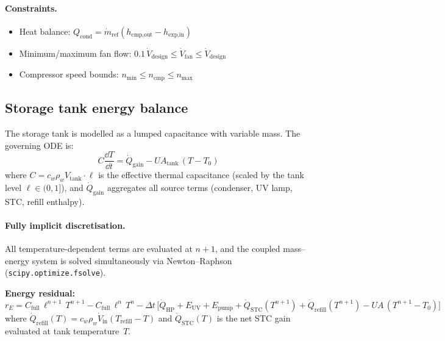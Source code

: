 \paragraph{Constraints.}
\begin{itemize}
  \item Heat balance: $Q_\text{cond} = \dot{m}_\text{ref}(h_\text{cmp,out} - h_\text{exp,in})$
  \item Minimum/maximum fan flow: $0.1\,\dot{V}_\text{design} \le \dot{V}_\text{fan} \le \dot{V}_\text{design}$
  \item Compressor speed bounds: $n_\text{min} \le n_\text{cmp} \le n_\text{max}$
\end{itemize}

\subsection{Storage tank energy balance}
\label{sec:ashpb-tank}

The storage tank is modelled as a lumped capacitance with variable mass.
The governing ODE is:
\begin{equation}\label{eq:ashp-tank-ode}
  C \frac{\dd T}{\dd t} = \dot{Q}_\text{gain} - UA_\text{tank}\,(T - T_0)
\end{equation}
where $C = c_w \rho_w V_\text{tank} \cdot \ell$ is the effective thermal capacitance
(scaled by the tank level $\ell \in (0,1]$),
and $\dot{Q}_\text{gain}$ aggregates all source terms
(condenser, UV lamp, STC, refill enthalpy).

\paragraph{Fully implicit discretisation.}
All temperature-dependent terms are evaluated at $n{+}1$, and the
coupled mass--energy system is solved simultaneously via Newton--Raphson
(\texttt{scipy.optimize.fsolve}).

\textbf{Energy residual:}
\begin{equation}\label{eq:ashp-implicit-energy}
  r_E = C_\text{full}\,\ell^{n+1}\,T^{n+1}
      - C_\text{full}\,\ell^{n}\,T^{n}
      - \Delta t\,\bigl[
          \dot{Q}_\text{HP} + E_\text{UV} + E_\text{pump}
          + \dot{Q}_\text{STC}(T^{n+1})
          + \dot{Q}_\text{refill}(T^{n+1})
          - UA\,(T^{n+1} - T_0)
        \bigr]
\end{equation}
where
$\dot{Q}_\text{refill}(T) = c_w \rho_w \dot{V}_\text{in}(T_\text{refill} - T)$
and
$\dot{Q}_\text{STC}(T)$ is the net STC gain evaluated at tank temperature~$T$.

